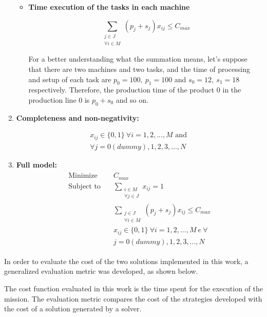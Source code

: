 \documentclass[conference,harvard,brazil,english]{sbatex}
\begin{document}
\begin{enumerate}
\begin{itemize}
\item \textbf{Time execution of the tasks in each machine}

\begin{equation}
\sum_{\substack{
   j \in J\\
   \forall i \in M
  }} 
 (p_j+s_j)x_{ij}\leq C_{max}
\end{equation}

For a better understanding what the summation means, let's suppose that there are two machines and two tasks, and the time of processing and setup of each task are $p_0=100,~ p_1=100$ and $s_0=12,~ s_1=18$ respectively. Therefore, the production time of the product $0$ in the production line $0$ is $p_0 + s_0$ and so on. 
\end{itemize}
\item \textbf{Completeness and non-negativity:}

\begin{equation}
\begin{split}
 x_{ij} \in \{0,1\}~\forall i=1,2,...,M\text{ and }\\
 \forall j=0(dummy), 1,2,3,...,N
\end{split}
\end{equation}

\item \textbf{Full model:}
\begin{align*}
\begin{split}
\text{Minimize~~~}  & C_{max} \\
    \text{Subject to~~~}  &\sum_{\substack{
   i \in M\\
   \forall j \in J
  }} 
  x_{ij}=1 \\
    & \sum_{\substack{
   j \in J\\
   \forall i \in M
  }} 
 (p_j+s_j)x_{ij}\leq C_{max} \\
 	& x_{ij} \in \{0,1\}~\forall i=1,2,...,M ~e~
 	\forall \\
 &j=0(dummy), 1,2,3,...,N
\end{split}
\end{align*}

\end{enumerate}

In order to evaluate the cost of the two solutions implemented in this work, a generalized evaluation metric was developed, as shown below.

The cost function evaluated in this work is the time spent for the execution of the mission. The evaluation metric compares the cost of the strategies developed with the cost of a solution generated by a solver.
\end{document}
